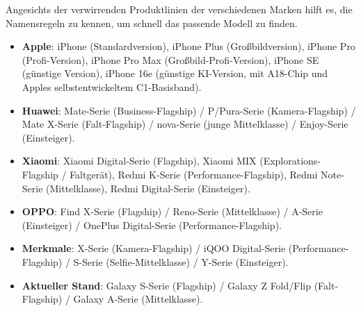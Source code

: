 
Angesichts der verwirrenden Produktlinien der verschiedenen Marken hilft es, die Namensregeln zu kennen, um schnell das passende Modell zu finden.


\begin{itemize}
  \item \textbf{Apple}: iPhone (Standardversion), iPhone Plus (Großbildversion), iPhone Pro (Profi-Version), iPhone Pro Max (Großbild-Profi-Version), iPhone SE (günstige Version), iPhone 16e (günstige KI-Version, mit A18-Chip und Apples selbstentwickeltem C1-Basisband).
  \item \textbf{Huawei}: Mate-Serie (Business-Flagship) / P/Pura-Serie (Kamera-Flagship) / Mate X-Serie (Falt-Flagship) / nova-Serie (junge Mittelklasse) / Enjoy-Serie (Einsteiger).
  \item \textbf{Xiaomi}: Xiaomi Digital-Serie (Flagship), Xiaomi MIX (Explorations-Flagship / Faltgerät), Redmi K-Serie (Performance-Flagship), Redmi Note-Serie (Mittelklasse), Redmi Digital-Serie (Einsteiger).
  \item \textbf{OPPO}: Find X-Serie (Flagship) / Reno-Serie (Mittelklasse) / A-Serie (Einsteiger) / OnePlus Digital-Serie (Performance-Flagship).
  \item \textbf{Merkmale}: X-Serie (Kamera-Flagship) / iQOO Digital-Serie (Performance-Flagship) / S-Serie (Selfie-Mittelklasse) / Y-Serie (Einsteiger).
  \item \textbf{Aktueller Stand}: Galaxy S-Serie (Flagship) / Galaxy Z Fold/Flip (Falt-Flagship) / Galaxy A-Serie (Mittelklasse).
\end{itemize}



